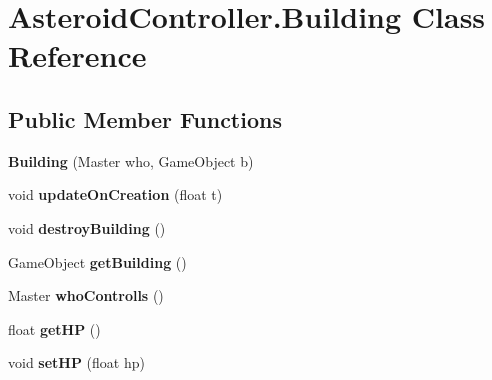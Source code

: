 \hypertarget{class_asteroid_controller_1_1_building}{}\section{Asteroid\+Controller.\+Building Class Reference}
\label{class_asteroid_controller_1_1_building}
\subsection*{Public Member Functions}
\begin{DoxyCompactItemize}
\item 
\hypertarget{class_asteroid_controller_1_1_building_ac4c0a79f7a3c8283448d0ec492567088}{}{\bfseries Building} (Master who, Game\+Object b)\label{class_asteroid_controller_1_1_building_ac4c0a79f7a3c8283448d0ec492567088}

\item 
\hypertarget{class_asteroid_controller_1_1_building_a251816c3dbfdc0628616dd0b16a52953}{}void {\bfseries update\+On\+Creation} (float t)\label{class_asteroid_controller_1_1_building_a251816c3dbfdc0628616dd0b16a52953}

\item 
\hypertarget{class_asteroid_controller_1_1_building_aa459e03784cd13bb7721a45a410f6676}{}void {\bfseries destroy\+Building} ()\label{class_asteroid_controller_1_1_building_aa459e03784cd13bb7721a45a410f6676}

\item 
\hypertarget{class_asteroid_controller_1_1_building_a924015ad91f9057bc12339a629e7f478}{}Game\+Object {\bfseries get\+Building} ()\label{class_asteroid_controller_1_1_building_a924015ad91f9057bc12339a629e7f478}

\item 
\hypertarget{class_asteroid_controller_1_1_building_ad9f7cc6118bc26552a28bed625a0b4e4}{}Master {\bfseries who\+Controlls} ()\label{class_asteroid_controller_1_1_building_ad9f7cc6118bc26552a28bed625a0b4e4}

\item 
\hypertarget{class_asteroid_controller_1_1_building_a08c8ffcba512689bda4c6ac59f2e8a18}{}float {\bfseries get\+H\+P} ()\label{class_asteroid_controller_1_1_building_a08c8ffcba512689bda4c6ac59f2e8a18}

\item 
\hypertarget{class_asteroid_controller_1_1_building_a1f2fb2f9ea4c54952bb4af3fc62d288f}{}void {\bfseries set\+H\+P} (float hp)\label{class_asteroid_controller_1_1_building_a1f2fb2f9ea4c54952bb4af3fc62d288f}


\end{DoxyCompactItemize}
